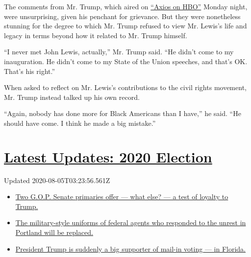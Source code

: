 The comments from Mr. Trump, which aired on
\href{https://www.axios.com/full-axios-hbo-interview-donald-trump-cd5a67e1-6ba1-46c8-bb3d-8717ab9f3cc5.html}{``Axios
on HBO''} Monday night, were unsurprising, given his penchant for
grievance. But they were nonetheless stunning for the degree to which
Mr. Trump refused to view Mr. Lewis's life and legacy in terms beyond
how it related to Mr. Trump himself.

``I never met John Lewis, actually,'' Mr. Trump said. ``He didn't come
to my inauguration. He didn't come to my State of the Union speeches,
and that's OK. That's his right.''

When asked to reflect on Mr. Lewis's contributions to the civil rights
movement, Mr. Trump instead talked up his own record.

``Again, nobody has done more for Black Americans than I have,'' he
said. ``He should have come. I think he made a big mistake.''

\hypertarget{latest-updates-2020-election}{%
\section{\texorpdfstring{\href{https://www.nytimes.com/2020/08/04/us/elections/primary-election-michigan-arizona-kansas.html?action=click\&pgtype=Article\&state=default\&region=MAIN_CONTENT_1\&context=storylines_live_updates}{Latest
Updates: 2020
Election}}{Latest Updates: 2020 Election}}\label{latest-updates-2020-election}}

Updated 2020-08-05T03:23:56.561Z

\begin{itemize}
\tightlist
\item
  \href{https://www.nytimes.com/2020/08/04/us/elections/primary-election-michigan-arizona-kansas.html?action=click\&pgtype=Article\&state=default\&region=MAIN_CONTENT_1\&context=storylines_live_updates\#link-3924dd44}{Two
  G.O.P. Senate primaries offer --- what else? --- a test of loyalty to
  Trump.}
\item
  \href{https://www.nytimes.com/2020/08/04/us/elections/primary-election-michigan-arizona-kansas.html?action=click\&pgtype=Article\&state=default\&region=MAIN_CONTENT_1\&context=storylines_live_updates\#link-62a8e06b}{The
  military-style uniforms of federal agents who responded to the unrest
  in Portland will be replaced.}
\item
  \href{https://www.nytimes.com/2020/08/04/us/elections/primary-election-michigan-arizona-kansas.html?action=click\&pgtype=Article\&state=default\&region=MAIN_CONTENT_1\&context=storylines_live_updates\#link-32b39e33}{President
  Trump is suddenly a big supporter of mail-in voting --- in Florida.}
\end{itemize}

